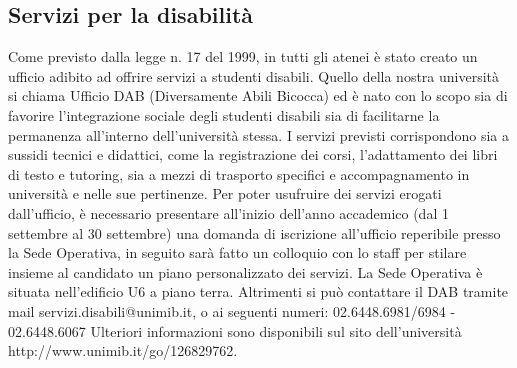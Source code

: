 \subsection{Servizi per la disabilità}
Come previsto dalla legge n. 17 del 1999, in tutti gli atenei è stato creato un ufficio adibito ad offrire servizi a studenti disabili. Quello della nostra università si chiama Ufficio DAB (Diversamente Abili Bicocca) ed è nato con lo scopo sia di favorire l'integrazione sociale degli studenti disabili sia di facilitarne la permanenza all'interno dell'università stessa. 
I servizi previsti corrispondono sia a sussidi tecnici e didattici, come la registrazione dei corsi, l'adattamento dei libri di testo e tutoring, sia a mezzi di trasporto specifici e accompagnamento in università e nelle sue pertinenze. Per poter usufruire dei servizi erogati dall'ufficio, è necessario presentare all'inizio dell'anno accademico (dal 1 settembre al 30 settembre) una domanda di iscrizione all'ufficio reperibile presso la Sede Operativa, in seguito sarà fatto un colloquio con lo staff per stilare insieme al candidato un piano personalizzato dei servizi. 
La Sede Operativa è situata nell'edificio U6 a piano terra. Altrimenti si può contattare il DAB tramite mail  servizi.disabili@unimib.it, o ai seguenti numeri: 02.6448.6981/6984 - 02.6448.6067 
Ulteriori informazioni sono disponibili sul sito dell'università http://www.unimib.it/go/126829762.

